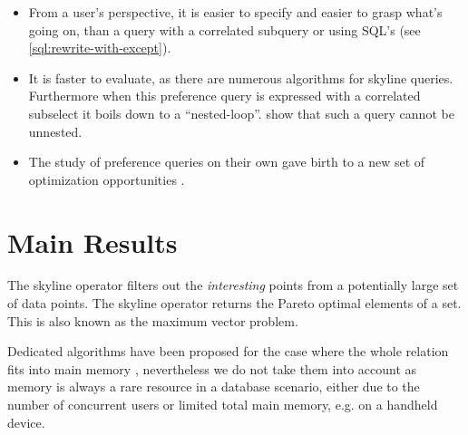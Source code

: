 \begin{itemize}
\item 
From a user's perspective, it is easier to specify and easier to grasp
what's going on, than a query with a correlated subquery or using
SQL's  (see \autoref{sql:rewrite-with-except}).

\item
It is faster to evaluate, as there are numerous algorithms for skyline
queries. Furthermore when this preference query is expressed with a correlated
subselect it boils down to a \naive ``nested-loop''.
\citet{Grust1997, Braumandl1998} show that such a query cannot be
unnested.

\item
The study of preference queries on their own gave birth to a new set
of optimization opportunities \citep{Chomicki2003a, Kiessling2003}.
\end{itemize}

% 
% 
% 
% 
% 
% 
% 
%


\section{Main Results} 
The skyline operator \citep{Borzsonyi2001} filters out the
\emph{interesting} points from a potentially large set of data
points. The skyline operator returns the Pareto optimal elements of a set. This is also known as the maximum vector
problem.

Dedicated algorithms have been proposed for the case where the whole relation
fits into main memory \citep{Preparata1985}, nevertheless we do not
take them into account as memory is always a rare resource in a
database scenario, either due to the number of concurrent users or
limited total main memory, e.g. on a handheld device.

